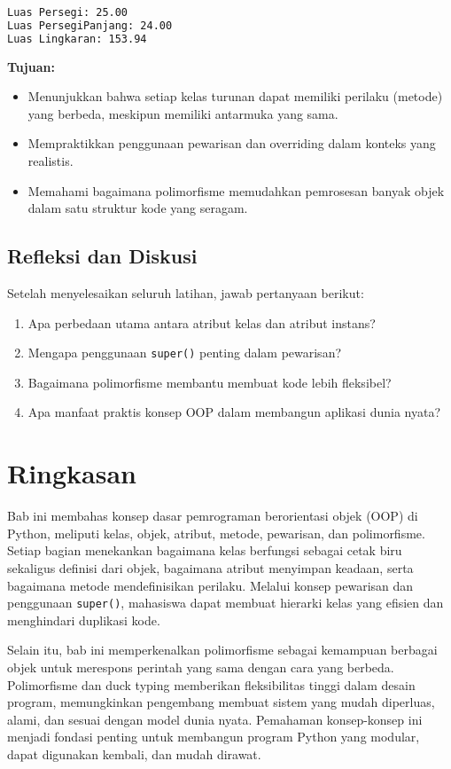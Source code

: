 \begin{lstlisting}[language=bash, caption={Output Program}]
Luas Persegi: 25.00
Luas PersegiPanjang: 24.00
Luas Lingkaran: 153.94
\end{lstlisting}

\textbf{Tujuan:}
\begin{itemize}
    \item Menunjukkan bahwa setiap kelas turunan dapat memiliki perilaku (metode) yang berbeda, meskipun memiliki antarmuka yang sama.
    \item Mempraktikkan penggunaan pewarisan dan overriding dalam konteks yang realistis.
    \item Memahami bagaimana polimorfisme memudahkan pemrosesan banyak objek dalam satu struktur kode yang seragam.
\end{itemize}


\subsection*{Refleksi dan Diskusi}
Setelah menyelesaikan seluruh latihan, jawab pertanyaan berikut:
\begin{enumerate}
    \item Apa perbedaan utama antara atribut kelas dan atribut instans?
    \item Mengapa penggunaan \texttt{super()} penting dalam pewarisan?
    \item Bagaimana polimorfisme membantu membuat kode lebih fleksibel?
    \item Apa manfaat praktis konsep OOP dalam membangun aplikasi dunia nyata?
\end{enumerate}

\section{Ringkasan}
	
Bab ini membahas konsep dasar pemrograman berorientasi objek (OOP) di Python, meliputi kelas, objek, atribut, metode, pewarisan, dan polimorfisme. Setiap bagian menekankan bagaimana kelas berfungsi sebagai cetak biru sekaligus definisi dari objek, bagaimana atribut menyimpan keadaan, serta bagaimana metode mendefinisikan perilaku. Melalui konsep pewarisan dan penggunaan \texttt{super()}, mahasiswa dapat membuat hierarki kelas yang efisien dan menghindari duplikasi kode.

Selain itu, bab ini memperkenalkan polimorfisme sebagai kemampuan berbagai objek untuk merespons perintah yang sama dengan cara yang berbeda. Polimorfisme dan duck typing memberikan fleksibilitas tinggi dalam desain program, memungkinkan pengembang membuat sistem yang mudah diperluas, alami, dan sesuai dengan model dunia nyata. Pemahaman konsep-konsep ini menjadi fondasi penting untuk membangun program Python yang modular, dapat digunakan kembali, dan mudah dirawat.

